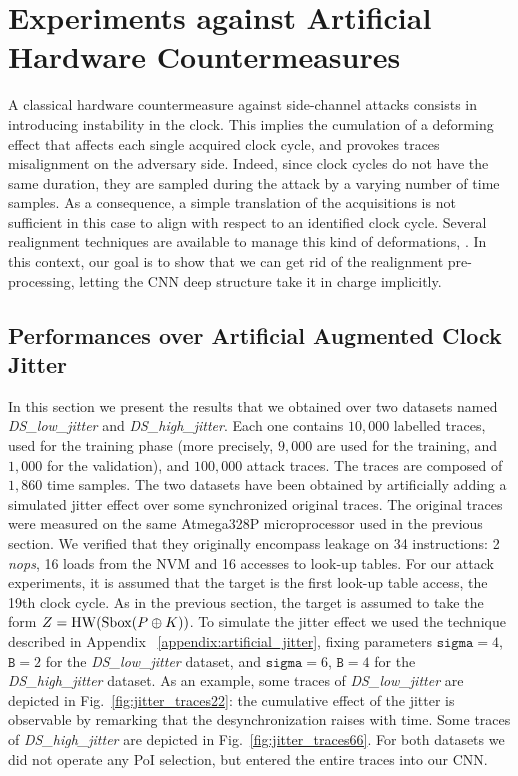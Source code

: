 

\section{Experiments against Artificial Hardware Countermeasures}\label{sec:hard}

A classical hardware countermeasure against side-channel attacks consists in introducing instability in the clock. This implies the cumulation of a deforming effect that affects each single acquired clock cycle, and provokes traces misalignment on the adversary side. Indeed, since clock cycles do not have the same duration, they are sampled during the attack by a varying number of time samples. As a consequence, a simple translation of the acquisitions is not sufficient in this case to align with respect to an identified clock cycle. Several realignment techniques are available to manage this kind of deformations, \eg \cite{van2011improving}. In this context, our goal is to show that  we can get rid of the realignment pre-processing, letting the CNN deep structure take it in charge implicitly. 

\subsection{Performances over Artificial Augmented Clock Jitter}\label{sec:artificial}
In this section we present the results that we obtained over two datasets named \emph{DS\_low\_jitter} and \emph{DS\_high\_jitter}. Each one contains $10,000$ labelled traces, used for the training phase (more precisely, $9,000$ are used for the training, and $1,000$ for the validation), and $100,000$ attack traces. The traces are composed of $1,860$ time samples. The two datasets have been obtained by artificially adding a simulated jitter effect over some synchronized original traces. The original traces were measured on the same Atmega328P microprocessor used in the previous section. We verified that they originally encompass leakage on 34 instructions: 2 \emph{nops}, 16 loads from the NVM and 16 accesses to look-up tables. For our attack experiments, it is assumed that the target is the first look-up table access, \ie the 19th clock cycle. As in the previous section, the target is assumed to take the form $Z=\mathrm{HW}(\mathrm{Sbox}(P\oplus K))$. To simulate the jitter effect we used the technique described in Appendix~	\ref{appendix:artificial_jitter}, fixing parameters $\texttt{sigma}=4$, $\texttt{B}=2$ for the \emph{DS\_low\_jitter} dataset,  and $\texttt{sigma}=6$, $\texttt{B}=4$ for the \emph{DS\_high\_jitter} dataset. As an example, some traces of  \emph{DS\_low\_jitter} are depicted in  Fig.~\ref{fig:jitter_traces22}: the cumulative effect of the jitter is observable by remarking that the desynchronization raises with time. Some traces of \emph{DS\_high\_jitter} are depicted in Fig.~\ref{fig:jitter_traces66}. For both datasets we did not operate any PoI selection, but entered the entire traces into our CNN.


